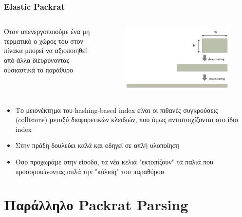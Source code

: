 \documentclass{beamer}
\begin{document}
\begin{frame}
  \frametitle{Elastic Packrat}
\begin{columns}

Όταν απενεργοποιούμε ένα μη τερματικό ο χώρος του στον πίνακα μπορεί να αξιοποιηθεί από άλλα διευρύνοντας ουσιαστικά το παράθυρο

\begin{figure}[h]
    \centering
	\includegraphics[width=1.00\textwidth]{../transcript/pics/elastic_slide_window}
\end{figure} 
\pause
\end{columns}

	\begin{itemize}
	  \item Το μειονέκτημα του hashing-based index είναι οι πιθανές συγκρούσεις (collisions) μεταξύ διαφορετικών κλειδιών, που όμως αντιστοιχίζονται στο ίδιο index \pause
	  \item Στην πράξη δουλεύει καλά και οδηγεί σε απλή υλοποίηση 
	  \item Όσο προχωράμε στην είσοδο, τα νέα κελιά "εκτοπίζουν" τα παλιά που προσομοιώνοντας απλά την "κύλιση" του παραθύρου
	\end{itemize}
\end{frame}
\fi
\section{Παράλληλο Packrat Parsing}
\end{document}
